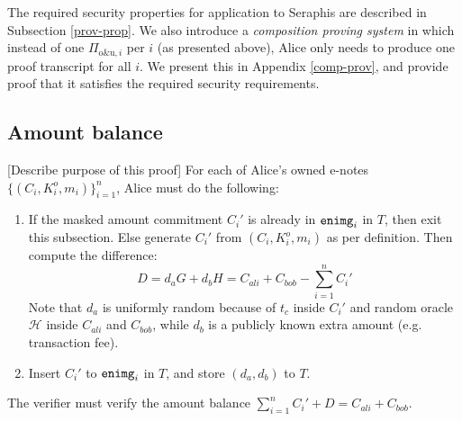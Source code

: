 \documentclass{article}
\theoremstyle{plain}
\theoremstyle{remark}
\begin{document}
The required security properties for application to Seraphis are described in Subsection \ref{prov-prop}. We also introduce a \textit{composition proving system} in which instead of one $\Pi_{\text{o\&u}, i}$ per $i$ (as presented above), Alice only needs to produce one proof transcript for all $i$. We present this in Appendix \ref{comp-prov}, and provide proof that it satisfies the required security requirements.

\subsection{Amount balance}\label{amt-bal}
[Describe purpose of this proof] For each of Alice's owned e-notes $\{(C_i,K_i^o,m_i)\}_{i=1}^n$, Alice must do the following:
\begin{enumerate}
    \item If the masked amount commitment $C_i'$ is already in ${\tt enimg}_i$ in $T$, then exit this subsection. Else generate $C_i'$ from $(C_i, K_i^o, m_i)$ as per definition. Then compute the difference:
    $$D = d_a G + d_b H = C_{ali}+C_{bob} - \sum_{i=1}^n{C_i'}$$
    Note that $d_a$ is uniformly random because of $t_c$ inside $C_i'$ and random oracle $\mathcal{H}$ inside $C_{ali}$ and $C_{bob}$, while $d_b$ is a publicly known extra amount (e.g. transaction fee).
    \item Insert $C_i'$ to ${\tt enimg}_i$ in $T$, and store $(d_a, d_b)$ to $T$.
\end{enumerate}
The verifier must verify the amount balance $\sum_{i=1}^n{C_i'} + D = C_{ali}+C_{bob}$.
\end{document}
